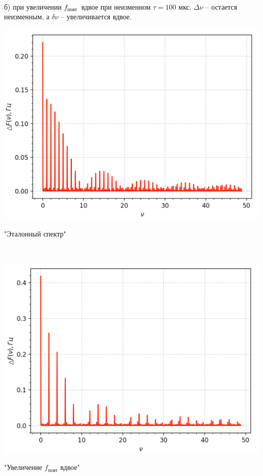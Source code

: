 \\
\
\\
\

б) при увеличении $f_{\text {повт }}$ вдвое при неизменном $\tau=100$ мкс. $\Delta \nu$ -- остается неизменным, а $\delta \nu$ -- увеличивается вдвое. 

\begin{minipage}{0.44\textwidth}
\includegraphics[width=\linewidth]{1.png}\\
\begin{center}
"Эталонный спектр"
\end{center}
\end{minipage}
\begin{minipage}{0.1\textwidth}
\ \ \ \ \ \ \Rightarrow
\end{minipage}
\begin{minipage}{0.44\textwidth}
\includegraphics[width=\linewidth]{3.png}\\
\begin{center}
"Увеличение $f_{повт}$ вдвое"
\end{center}
\end{minipage}

